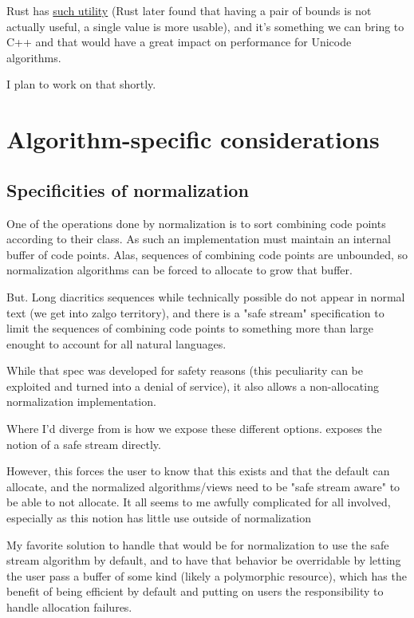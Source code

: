 \documentclass{wg21}
\begin{document}
Rust has \href{https://doc.rust-lang.org/std/iter/trait.Iterator.html#method.size_hint}{such utility} (Rust later found that having a pair of bounds is not actually useful, a single value is more usable), and it's something we can bring to C++ and that would have a great impact on performance for Unicode algorithms.

I plan to work on that shortly.

\section{Algorithm-specific considerations}

\subsection{Specificities of normalization}

One of the operations done by normalization is to sort combining code points according to their class.
As such an implementation must maintain an internal buffer of code points.
Alas, sequences of combining code points are unbounded, so normalization algorithms can be forced to allocate to grow that buffer.

But. Long diacritics sequences while technically possible do not appear in normal text (we get into zalgo territory), and there is a "safe stream" specification
to limit the sequences of combining code points to something more than large enought to account for all natural languages.

While that spec was developed for safety reasons (this peculiarity can be exploited and turned into a denial of service), it also allows a non-allocating normalization implementation.

Where I'd diverge from  is how we expose these different options.
 exposes the notion of a safe stream directly.

However, this forces the user to know that this exists and that the default can allocate, and the normalized algorithms/views need to be "safe stream aware" to be able to not allocate.
It all seems to me awfully complicated for all involved, especially as this notion has little use outside of normalization

My favorite solution to handle that would be for normalization to use the safe stream algorithm by default, and to have that behavior be overridable by letting the user
pass a buffer of some kind (likely a polymorphic resource), which has the benefit of being efficient by default and putting on users the responsibility to handle allocation failures.
\end{document}
